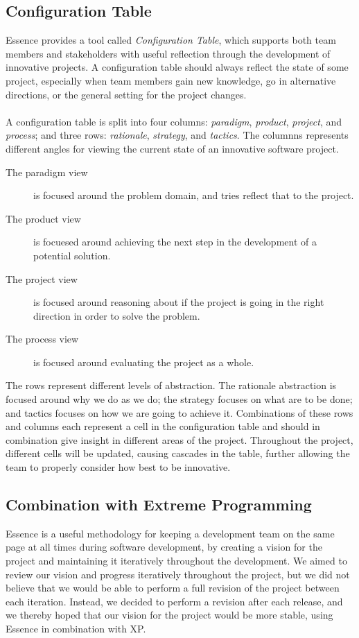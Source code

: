 \subsection{Configuration Table}
Essence provides a tool called \emph{Configuration Table}\parencite{essence_book}, which supports both team members and stakeholders with useful reflection through the development of innovative projects. A configuration table should always reflect the state of some project, especially when team members gain new knowledge, go in alternative directions, or the general setting for the project changes.
\\\\
A configuration table is split into four columns: \emph{paradigm}, \emph{product}, \emph{project}, and \emph{process}; and three rows: \emph{rationale}, \emph{strategy}, and \emph{tactics}. The columnns represents different angles for viewing the current state of an innovative software project. 
\begin{description}
	\item[The paradigm view] is focused around the problem domain, and tries reflect that to the project. 
	\item[The product view] is focuesed around achieving the next step in the development of a potential solution. 
	\item[The project view] is focused around reasoning about if the project is going in the right direction in order to solve the problem. 
	\item[The process view] is focused around evaluating the project as a whole. 
\end{description}

The rows represent different levels of abstraction. The rationale abstraction is focused around why we do as we do; the strategy focuses on what are to be done; and tactics focuses on how we are going to achieve it. Combinations of these rows and columns each represent a cell in the configuration table and should in combination give insight in different areas of the project. Throughout the project, different cells will be updated, causing cascades in the table, further allowing the team to properly consider how best to be innovative. 


\subsection{Combination with Extreme Programming}
\label{sub:combination_with_extreme_programming}
Essence is a useful methodology for keeping a development team on the same page at all times during software development, by creating a vision for the project and maintaining it iteratively throughout the development. We aimed to review our vision and progress iteratively throughout the project, but we did not believe that we would be able to perform a full revision of the project between each iteration. Instead, we decided to perform a revision after each release, and we thereby hoped that our vision for the project would be more stable, using Essence in combination with XP. 